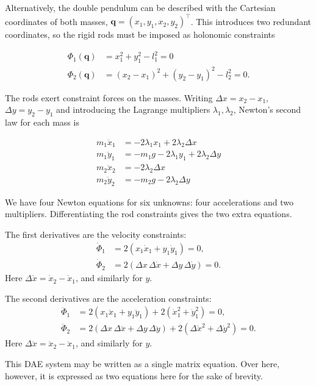Alternatively, the double pendulum can be described with the Cartesian coordinates of both masses, $\mathbf{q} = (x_1, y_1, x_2, y_2)^\top$. This introduces two redundant coordinates, so the rigid rods must be imposed as holonomic constraints

\begin{align}
    \Phi_1(\mathbf{q}) &= x_1^2 + y_1^2 - l_1^2 = 0 \\
    \Phi_2(\mathbf{q}) &= (x_2-x_1)^2 + (y_2-y_1)^2 - l_2^2 = 0.
\end{align}

The rods exert constraint forces on the masses. Writing $\Delta x = x_2 - x_1$, $\Delta y = y_2 - y_1$ and introducing the Lagrange multipliers $\lambda_1, \lambda_2$, Newton's second law for each mass is

\begin{align}
    m_1\ddot{x}_1 &= -2\lambda_1 x_1 + 2\lambda_2\Delta x \\
    m_1\ddot{y}_1 &= -m_1 g - 2\lambda_1 y_1 + 2\lambda_2\Delta y \\
    m_2\ddot{x}_2 &= -2\lambda_2\Delta x \\
    m_2\ddot{y}_2 &= -m_2 g - 2\lambda_2\Delta y
\end{align}

We have four Newton equations for six unknowns: four accelerations and two multipliers. Differentiating the rod constraints gives the two extra equations.

The first derivatives are the velocity constraints:
\begin{align}
\dot\Phi_1 &= 2(x_1\dot x_1+y_1\dot y_1)=0,\\
\dot\Phi_2 &= 2(\Delta x\,\Delta\dot x+\Delta y\,\Delta\dot y)=0.
\end{align}
Here $\Delta\dot x=\dot x_2-\dot x_1$, and similarly for $y$.

The second derivatives are the acceleration constraints:
\begin{align}
\ddot\Phi_1 &= 2(x_1\ddot x_1+y_1\ddot y_1)
              +2(\dot x_1^2+\dot y_1^2)=0,\\
\ddot\Phi_2 &= 2(\Delta x\,\Delta\ddot x+\Delta y\,\Delta\ddot y)
              +2(\Delta\dot x^2+\Delta\dot y^2)=0.
\end{align}
Here $\Delta\ddot x=\ddot x_2-\ddot x_1$, and similarly for $y$.

This DAE system  may be written as a single matrix equation. Over here, however, it is expressed as two equations here for the sake of brevity.

